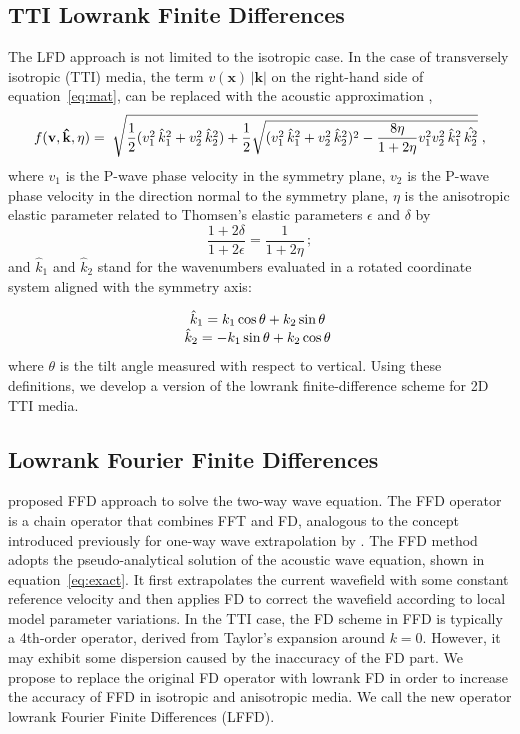 \subsection{TTI Lowrank Finite Differences}
The LFD approach is not limited to the isotropic case.
In the case of transversely isotropic (TTI) media, the term $v(\mathbf{x})\,|\mathbf{k}|$ on the right-hand side of equation~\ref{eq:mat},
can be replaced with the acoustic approximation \cite[]{alkhalifah1,alkhalifah2,anelliptic},
\begin{equation}
\label{eq:ttiexact} 
\begin{array}{*{20}l}
f(\mathbf{v},\mathbf{\hat{k}},\eta)=\;
\displaystyle \sqrt{\frac{1}{2}(v_1^2\,\hat{k}_1^2+v_2^2\,\hat{k}_2^2)+\frac{1}{2}\sqrt{(v_1^2\,\hat{k}_1^2+v_2^2\,\hat{k}_2^2)^2-\frac{8\eta}{1+2\eta}v_1^2v_2^2\,\hat{k}_1^2\,\hat{k_2^2}}}\;, 
\end{array}
\end{equation}
where $v_1$ is the P-wave phase velocity in the symmetry plane,
$v_2$ is the P-wave phase velocity in the direction normal to the symmetry plane,
$\eta$ is the anisotropic elastic parameter \cite[]{alkhalifah} related to Thomsen's elastic parameters $\epsilon$ and $\delta$ \cite[]{thomsen} by
\begin{equation}
\label{eq:tom}
\frac{1+2\delta}{1+2\epsilon}=\frac{1}{1+2\eta}\,;
\end{equation}
and $\hat{k}_1$ and $\hat{k}_2$ stand for the wavenumbers evaluated in a rotated coordinate system aligned with the symmetry axis:

\begin{equation}
\label{eq:wavenumber}
\begin{array}{*{20}c}
\hat{k}_1=k_1\cos{\theta}+k_2\sin{\theta}\; \\
\hat{k}_2=-k_1\sin{\theta}+k_2\cos{\theta}\; 
 \end{array}
\end{equation}
where $\theta$ is the tilt angle measured with respect to vertical. 
Using these definitions, we develop a version of the lowrank finite-difference scheme for 2D TTI media. 

\subsection{Lowrank Fourier Finite Differences}
\cite{songx} proposed FFD approach to solve the two-way wave equation. 
The FFD operator is a chain operator that combines FFT and FD, analogous to the concept introduced previously for one-way wave extrapolation by \cite{ffd}.
The FFD method adopts the pseudo-analytical solution of the acoustic wave equation, shown in equation~\ref{eq:exact}.
It first extrapolates the current wavefield with some constant reference velocity 
and then applies FD to correct the wavefield according to local model parameter variations.  
In the TTI case, the FD scheme in FFD is typically a 4th-order operator, derived from Taylor's expansion around $k=0$. 
However, it may exhibit some dispersion caused by the inaccuracy of the FD part. 
We propose to replace the original FD operator with lowrank FD in order to increase the accuracy of FFD in isotropic and anisotropic media.
We call the new operator lowrank Fourier Finite Differences (LFFD). 

